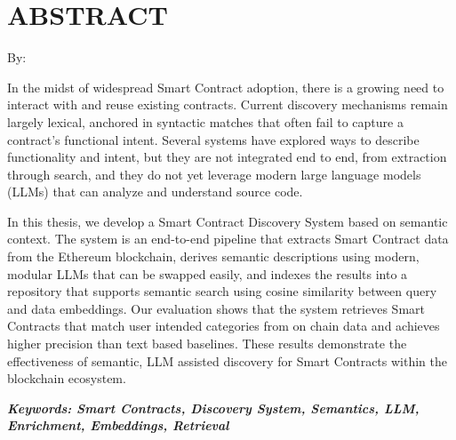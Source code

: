 \clearpage
\chapter*{ABSTRACT}

\begin{center}
	\center
	\begin{singlespace}
		\large\bfseries\MakeUppercase{\thetitle}

		\normalfont\normalsize
		By:

		\bfseries \theauthor
	\end{singlespace}
\end{center}

\begin{singlespace}
	\small

	In the midst of widespread Smart Contract adoption, there is a growing need to interact with and reuse existing contracts. Current discovery mechanisms remain largely lexical, anchored in syntactic matches that often fail to capture a contract's functional intent. Several systems have explored ways to describe functionality and intent, but they are not integrated end to end, from extraction through search, and they do not yet leverage modern large language models (LLMs) that can analyze and understand source code.

	In this thesis, we develop a Smart Contract Discovery System based on semantic context. The system is an end-to-end pipeline that extracts Smart Contract data from the Ethereum blockchain, derives semantic descriptions using modern, modular LLMs that can be swapped easily, and indexes the results into a repository that supports semantic search using cosine similarity between query and data embeddings. Our evaluation shows that the system retrieves Smart Contracts that match user intended categories from on chain data and achieves higher precision than text based baselines. These results demonstrate the effectiveness of semantic, LLM assisted discovery for Smart Contracts within the blockchain ecosystem.

	\textbf{\textit{Keywords: Smart Contracts, Discovery System, Semantics, LLM, Enrichment, Embeddings, Retrieval}}
\end{singlespace}
\clearpage

\clearpage